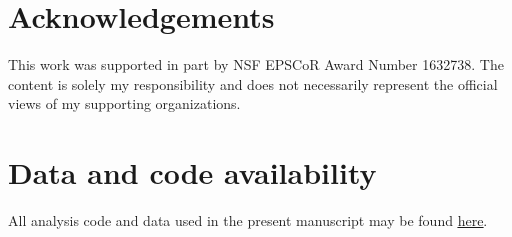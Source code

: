 \documentclass[11pt]{article}
\begin{document}
\section*{Acknowledgements}
This work was supported in part by NSF EPSCoR Award Number 1632738. The content is solely my responsibility and does not necessarily represent the official views of my supporting organizations.

\section*{Data and code availability}
All analysis code and data used in the present manuscript may be found \href{https://github.com/ContextLab/directed-forgetting-network-dynamics}{\underline{here}}.



\end{document}
